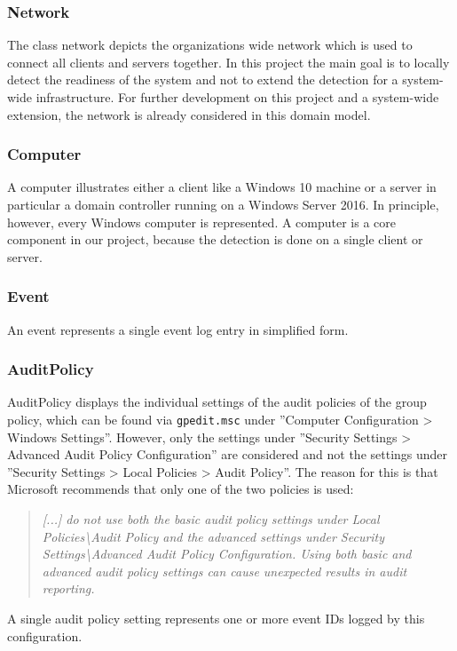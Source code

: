\subsubsection{Network}
The class network depicts the organizations wide network which is used to connect all clients and servers together. In this project the main goal is to locally detect the readiness of the system and not to extend the detection for a system-wide infrastructure. For further development on this project and a system-wide extension, the network is already considered in this domain model.

\subsubsection{Computer}
A computer illustrates either a client like a Windows 10 machine or a server in particular a domain controller running on a Windows Server 2016. In principle, however, every Windows computer is represented. A computer is a core component in our project, because the detection is done on a single client or server. 

\subsubsection{Event}
An event represents a single event log entry in simplified form.

\subsubsection{AuditPolicy}\label{DomainModelAuditPolicy}
AuditPolicy displays the individual settings of the audit policies of the group policy, which can be found via \lstinline|gpedit.msc| under ''Computer Configuration > Windows Settings''. However, only the settings under ''Security Settings > Advanced Audit Policy Configuration'' are considered and not the settings under ''Security Settings > Local Policies > Audit Policy''. The reason for this is that Microsoft recommends that only one of the two policies is used:
\begin{quotation}
    \textit{[...] do not use both the basic audit policy settings under Local Policies\textbackslash Audit Policy and the advanced settings under Security Settings\textbackslash Advanced Audit Policy Configuration. Using both basic and advanced audit policy settings can cause unexpected results in audit reporting.} \cite{AdvancedSecurityAuditing}
\end{quotation}
A single audit policy setting represents one or more event IDs logged by this configuration.

